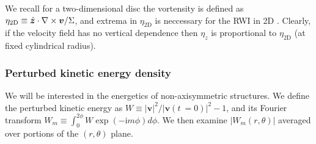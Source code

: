 We recall for a two-dimensional disc the vortensity is defined as 
$\eta_\mathrm{2D} \equiv \hat{\bm{z}}\cdot\nabla\times\bm{v}/\Sigma$, and
extrema in $\eta_\mathrm{2D}$ is neccessary for the RWI in
2D \citep{lovelace99,lin10}. Clearly, if the velocity field has no
vertical dependence then $\eta_z$ is proportional to
$\eta_\mathrm{2D}$ (at fixed cylindrical radius).   

\subsubsection{Perturbed kinetic energy density}  
We will be interested in the energetics of non-axisymmetric
structures. We define the perturbed kinetic energy as
$W\equiv|\bm{v}|^2/|\bm{v}(t~=0)|^2 - 1$, and its Fourier transform 
$W_m\equiv\int_0^{2\phi} W\exp{(-\mathrm{i}m\phi)}d\phi$. We then examine
$|W_m(r,\theta)|$ averaged over portions of the $(r,\theta)$
plane. %
